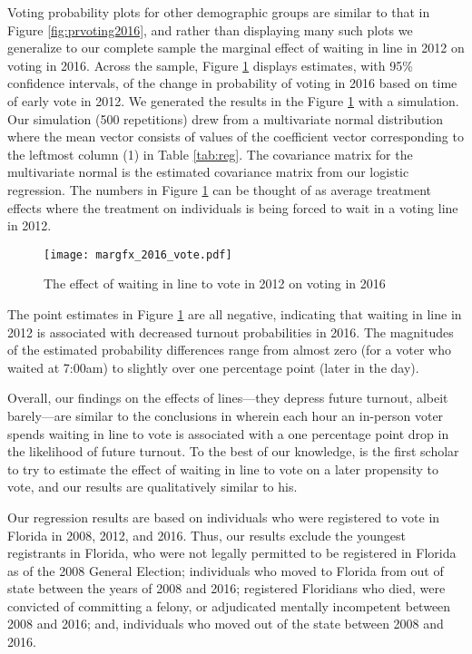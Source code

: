 \documentclass[12pt,titlepage]{article}
\begin{document}
Voting probability plots for other demographic groups are similar to
that in Figure \ref{fig:prvoting2016}, and rather than displaying many
such plots we generalize to our complete sample the marginal effect of
waiting in line in 2012 on voting in 2016.  Across the sample, Figure
\ref{fig:margfx2016} displays estimates, with 95\% confidence
intervals, of the change in probability of voting in 2016 based on
time of early vote in 2012.  We generated the results in the Figure
\ref{fig:margfx2016} with a simulation.  Our simulation (500
repetitions) drew from a multivariate normal distribution where the
mean vector consists of values of the coefficient vector corresponding
to the leftmost column (1) in Table \ref{tab:reg}.  The covariance
matrix for the multivariate normal is the estimated covariance matrix
from our logistic regression.  The numbers in Figure
\ref{fig:margfx2016} can be thought of as average treatment effects
where the treatment on individuals is being forced to wait in a voting
line in 2012.

%

\begin{figure}[!ht]
\caption{The effect of waiting in line to vote in 2012 on voting in 2016}
  \label{fig:margfx2016}
  \centering
    \centering\texttt{[image: margfx\_2016\_vote.pdf]}
\end{figure}


The point estimates in Figure \ref{fig:margfx2016} are all negative,
indicating that waiting in line in 2012 is associated with decreased
turnout probabilities in 2016.  The magnitudes of the estimated
probability differences range from almost zero (for a voter who waited
at 7:00am) to slightly over one percentage point (later in the day).

Overall, our findings on the effects of lines---they depress future
turnout, albeit barely---are similar to the conclusions in
\citet{pettigrew:longlinesminorityprecincts} wherein each hour an
in-person voter spends waiting in line to vote is associated with a
one percentage point drop in the likelihood of future turnout.  To the
best of our knowledge,
\citeauthor{pettigrew:longlinesminorityprecincts} is the first scholar
to try to estimate the effect of waiting in line to vote on a later
propensity to vote, and our results are qualitatively similar to his.

Our regression results are based on individuals who were registered to
vote in Florida in 2008, 2012, and 2016.  Thus, our results exclude
the youngest registrants in Florida, who were not legally permitted to
be registered in Florida as of the 2008 General Election; individuals
who moved to Florida from out of state between the years of 2008 and
2016; registered Floridians who died, were convicted of committing a
felony, or adjudicated mentally incompetent between 2008 and 2016;
and, individuals who moved out of the state between 2008 and 2016.
\end{document}
